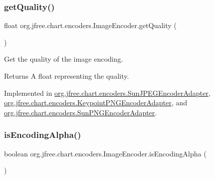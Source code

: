 \mbox{\label{interfaceorg_1_1jfree_1_1chart_1_1encoders_1_1_image_encoder_a292037d46187ca04bbd3a9362bf6ad22}} 
\subsubsection{\texorpdfstring{get\+Quality()}{getQuality()}}
{\footnotesize\ttfamily float org.\+jfree.\+chart.\+encoders.\+Image\+Encoder.\+get\+Quality (\begin{DoxyParamCaption}{ }\end{DoxyParamCaption})}

Get the quality of the image encoding.

\begin{DoxyReturn}{Returns}
A float representing the quality. 
\end{DoxyReturn}


Implemented in \mbox{\hyperlink{classorg_1_1jfree_1_1chart_1_1encoders_1_1_sun_j_p_e_g_encoder_adapter_af9230d0123dd8788669b558a94bb3c03}{org.\+jfree.\+chart.\+encoders.\+Sun\+J\+P\+E\+G\+Encoder\+Adapter}}, \mbox{\hyperlink{classorg_1_1jfree_1_1chart_1_1encoders_1_1_keypoint_p_n_g_encoder_adapter_ab92d602383fbc7db9084a9c7a5ecd0c5}{org.\+jfree.\+chart.\+encoders.\+Keypoint\+P\+N\+G\+Encoder\+Adapter}}, and \mbox{\hyperlink{classorg_1_1jfree_1_1chart_1_1encoders_1_1_sun_p_n_g_encoder_adapter_aa1012f037f19d693fec4e86da1d5f785}{org.\+jfree.\+chart.\+encoders.\+Sun\+P\+N\+G\+Encoder\+Adapter}}.

\mbox{\label{interfaceorg_1_1jfree_1_1chart_1_1encoders_1_1_image_encoder_afd771eda4e4d50113696e241f5a34f2c}} 
\subsubsection{\texorpdfstring{is\+Encoding\+Alpha()}{isEncodingAlpha()}}
{\footnotesize\ttfamily boolean org.\+jfree.\+chart.\+encoders.\+Image\+Encoder.\+is\+Encoding\+Alpha (\begin{DoxyParamCaption}{ }\end{DoxyParamCaption})}

